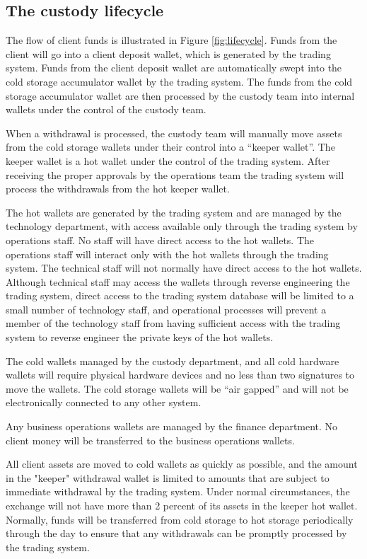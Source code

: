 \subsection{The custody lifecycle}
The flow of client funds is illustrated in Figure \ref{fig:lifecycle}.  Funds from the
client will go into a client deposit wallet, which is generated by the
trading system.  Funds from the client deposit wallet are
automatically swept into the cold storage accumulator wallet by the trading
system.  The funds from the cold storage accumulator wallet are then
processed by the custody team into internal wallets under the control
of the custody team.

When a withdrawal is processed, the custody team will manually move
assets from the cold storage wallets under their control into a
``keeper wallet''.  The keeper wallet is a hot wallet under the
control of the trading system.  After receiving the proper approvals
by the operations team the trading system will process the withdrawals
from the hot keeper wallet. 

The hot wallets are generated by the trading system and are managed by
the technology department, with access available only through the
trading system by operations staff.  No staff will have direct access
to the hot wallets.  The operations staff will interact only with the
hot wallets through the trading system.  The technical staff will not
normally have direct access to the hot wallets.  Although technical
staff may access the wallets through reverse engineering the trading
system, direct access to the trading system database will be limited
to a small number of technology staff, and operational processes will
prevent a member of the technology staff from having sufficient access
with the trading system to reverse engineer the private keys of the
hot wallets.

The cold wallets managed by the custody department, and all cold
hardware wallets will require physical hardware devices and no less
than two signatures to move the wallets.  The cold storage wallets
will be ``air gapped'' and will not be electronically connected to any
other system.

Any business operations wallets are managed by the finance
department.  No client money will be transferred to the business
operations wallets.

All client assets are moved to cold wallets as quickly as possible,
and the amount in the "keeper" withdrawal wallet is limited to
amounts that are subject to immediate withdrawal by the trading
system.  Under normal circumstances, the exchange will not have more
than 2 percent of its assets in the keeper hot wallet.  Normally,
funds will be transferred from cold storage to hot storage periodically
through the day to ensure that any withdrawals can be
promptly processed by the trading system.

